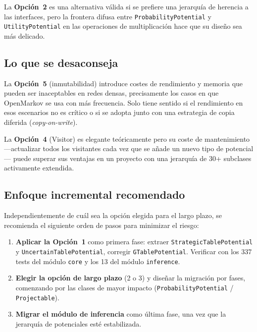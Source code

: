 \documentclass[11pt,a4paper]{article}
\newcommand{\code}[1]{\texttt{#1}}
\begin{document}
La \textbf{Opción~2} es una alternativa válida si se prefiere una jerarquía de
herencia a las interfaces, pero la frontera difusa entre \code{ProbabilityPotential}
y \code{UtilityPotential} en las operaciones de multiplicación hace que su diseño
sea más delicado.

\subsection{Lo que se desaconseja}

La \textbf{Opción~5} (inmutabilidad) introduce costes de rendimiento y memoria
que pueden ser inaceptables en redes densas, precisamente los casos en que
OpenMarkov se usa con más frecuencia.  Solo tiene sentido si el rendimiento
en esos escenarios no es crítico o si se adopta junto con una estrategia de
copia diferida (\emph{copy-on-write}).

La \textbf{Opción~4} (Visitor) es elegante teóricamente pero su coste de
mantenimiento ---actualizar todos los visitantes cada vez que se añade un nuevo
tipo de potencial--- puede superar sus ventajas en un proyecto con una jerarquía
de 30+ subclases activamente extendida.

\subsection{Enfoque incremental recomendado}

Independientemente de cuál sea la opción elegida para el largo plazo, se
recomienda el siguiente orden de pasos para minimizar el riesgo:

\begin{enumerate}
  \item \textbf{Aplicar la Opción~1} como primera fase: extraer
        \code{StrategicTablePotential} y \code{UncertainTablePotential}, corregir
        \code{GTablePotential}.  Verificar con los 337 tests del módulo
        \code{core} y los 13 del módulo \code{inference}.
  \item \textbf{Elegir la opción de largo plazo} (2 o 3) y diseñar la migración
        por fases, comenzando por las clases de mayor impacto
        (\code{ProbabilityPotential} / \code{Projectable}).
  \item \textbf{Migrar el módulo de inferencia} como última fase, una vez que
        la jerarquía de potenciales esté estabilizada.
\end{enumerate}

\newpage
\end{document}
